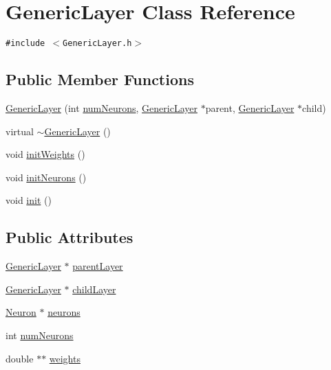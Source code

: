 \hypertarget{classGenericLayer}{
\section{GenericLayer Class Reference}
\label{classGenericLayer}
}
{\tt \#include $<$GenericLayer.h$>$}

\subsection*{Public Member Functions}
\begin{CompactItemize}
\item 
\hyperlink{classGenericLayer_03c284e00a6a3e261665f46dff41a9ea}{GenericLayer} (int \hyperlink{classGenericLayer_7b45631903aa50e67fe5a1947fc292bd}{numNeurons}, \hyperlink{classGenericLayer}{GenericLayer} $\ast$parent, \hyperlink{classGenericLayer}{GenericLayer} $\ast$child)
\item 
virtual \hyperlink{classGenericLayer_3abc382b20bf9585dbba35bb325fff90}{$\sim$GenericLayer} ()
\item 
void \hyperlink{classGenericLayer_2e2e170339c48bbcfe05afe9a1f60e43}{initWeights} ()
\item 
void \hyperlink{classGenericLayer_c9357145e80d180b812df7bddeb5139d}{initNeurons} ()
\item 
void \hyperlink{classGenericLayer_716fbf0e6e01271f9ae648dcf1bcccd9}{init} ()
\end{CompactItemize}
\subsection*{Public Attributes}
\begin{CompactItemize}
\item 
\hyperlink{classGenericLayer}{GenericLayer} $\ast$ \hyperlink{classGenericLayer_f936bd9ef0690287bf7ce9fdddaec09d}{parentLayer}
\item 
\hyperlink{classGenericLayer}{GenericLayer} $\ast$ \hyperlink{classGenericLayer_1eb75b8a4e3951ae983f801bb1d8c478}{childLayer}
\item 
\hyperlink{classNeuron}{Neuron} $\ast$ \hyperlink{classGenericLayer_2464f709af50f9def120c1978ed68f24}{neurons}
\item 
int \hyperlink{classGenericLayer_7b45631903aa50e67fe5a1947fc292bd}{numNeurons}
\item 
double $\ast$$\ast$ \hyperlink{classGenericLayer_e75dc38537415bb12a60fbbbbb4b3d75}{weights}
\end{CompactItemize}


